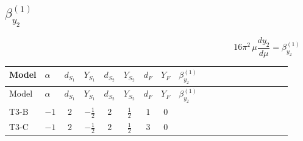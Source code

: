 \documentclass{article}
\begin{document}
\begin{landscape}
\section*{$\beta_{y_2}^{(1)}$}
\[16\pi^2\,\mu\frac{d y_2}{d\mu}=\beta_{y_2}^{(1)}\]
\tiny
\begin{longtable}{@{}llcccccc >{\raggedright\arraybackslash}p{0.54\linewidth}@{}}
\toprule
Model & $\alpha$ & $d_{S_1}$ & $Y_{S_1}$ & $d_{S_2}$ & $Y_{S_2}$ & $d_F$ & $Y_F$ & $\beta_{y_2}^{(1)}$ \\
\midrule
\endfirsthead
\toprule
Model & $\alpha$ & $d_{S_1}$ & $Y_{S_1}$ & $d_{S_2}$ & $Y_{S_2}$ & $d_F$ & $Y_F$ & $\beta_{y_2}^{(1)}$ \\
\midrule
\endhead
T3-B & $-1$ & $2$ & $-\frac{1}{2}$ & $2$ & $\frac{1}{2}$ & $1$ & $0$ & \scriptsize\adjustbox{max width=\linewidth}{$\begin{gathered} \operatorname{Tr}\!\left({y_2}\,\left({y_1}\right)^{\dagger}\right) \left({y_1}\right)_{ij} \\ +\operatorname{Tr}\!\left({y_2}\,\left({y_2}\right)^{\dagger}\right) \left({y_2}\right)_{ij} \\ +\frac{1}{2} (\left({y_1}\,\left({y_1}\right)^{\dagger}\,{y_2}\right)_{ij}+2 \left({y_2}\,\left({y_1}\right)^{\dagger}\,{y_1}\right)_{ij}+\left({Y_e}\,\left({Y_e}\right)^{\dagger}\,{y_2}\right)_{ij}+3 \left({y_2}\,\left({y_2}\right)^{\dagger}\,{y_2}\right)_{ij}) \\ -\frac{9}{4} {g_2}^2 \left({y_2}\right)_{ij} \\ -\frac{3}{4} {g_Y}^2 \left({y_2}\right)_{ij}\end{gathered}$} \\
\midrule
T3-C & $-1$ & $2$ & $-\frac{1}{2}$ & $2$ & $\frac{1}{2}$ & $3$ & $0$ & \scriptsize\adjustbox{max width=\linewidth}{$\begin{gathered} \frac{3}{2} \operatorname{Tr}\!\left({y_2}\,\left({y_1}\right)^{\dagger}\right) \left({y_1}\right)_{ij} \\ +\frac{3}{2} \operatorname{Tr}\!\left({y_2}\,\left({y_2}\right)^{\dagger}\right) \left({y_2}\right)_{ij} \\ +\frac{1}{4} (3 \left({y_1}\,\left({y_1}\right)^{\dagger}\,{y_2}\right)_{ij}+2 \left({y_2}\,\left({y_1}\right)^{\dagger}\,{y_1}\right)_{ij}+2 \left({Y_e}\,\left({Y_e}\right)^{\dagger}\,{y_2}\right)_{ij}+5 \left({y_2}\,\left({y_2}\right)^{\dagger}\,{y_2}\right)_{ij}) \\ -\frac{33}{4} {g_2}^2 \left({y_2}\right)_{ij} \\ -\frac{3}{4} {g_Y}^2 \left({y_2}\right)_{ij}\end{gathered}$} \\

\end{longtable}
\end{landscape}
\end{document}
